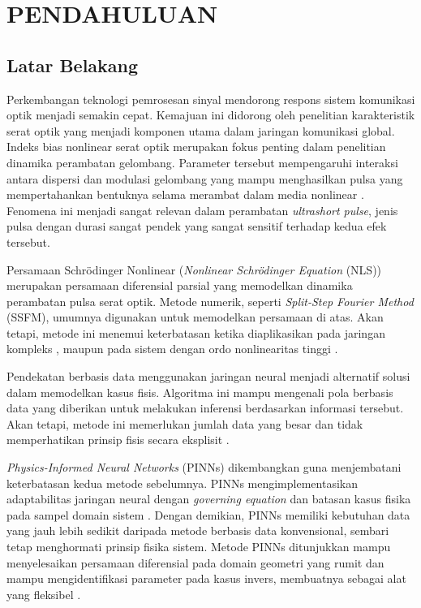 \chapter{PENDAHULUAN}

\section{Latar Belakang}
Perkembangan teknologi pemrosesan sinyal mendorong respons sistem komunikasi optik menjadi semakin cepat. Kemajuan ini didorong oleh penelitian karakteristik serat optik yang menjadi komponen utama dalam jaringan komunikasi global. Indeks bias nonlinear serat optik merupakan fokus penting dalam penelitian dinamika perambatan gelombang. Parameter tersebut mempengaruhi interaksi antara dispersi dan modulasi gelombang yang mampu menghasilkan pulsa yang mempertahankan bentuknya selama merambat dalam media nonlinear . Fenomena ini menjadi sangat relevan dalam perambatan \emph{ultrashort pulse}, jenis pulsa dengan durasi sangat pendek yang sangat sensitif terhadap kedua efek tersebut. 

Persamaan Schr\"{o}dinger Nonlinear (\textit{Nonlinear Schr\"{o}dinger Equation }(NLS)) merupakan persamaan diferensial parsial yang memodelkan dinamika perambatan pulsa serat optik. Metode numerik, seperti \textit{Split-Step Fourier Method} (SSFM), umumnya digunakan untuk memodelkan persamaan di atas. Akan tetapi, metode ini menemui keterbatasan ketika diaplikasikan pada jaringan kompleks , maupun pada sistem dengan ordo nonlinearitas tinggi . 

Pendekatan berbasis data menggunakan jaringan neural menjadi alternatif solusi dalam memodelkan kasus fisis. Algoritma ini mampu mengenali pola berbasis data yang diberikan untuk melakukan inferensi berdasarkan informasi tersebut. Akan tetapi, metode ini memerlukan jumlah data yang besar dan tidak memperhatikan prinsip fisis secara eksplisit . 

\textit{Physics-Informed Neural Networks} (PINNs) dikembangkan guna menjembatani keterbatasan kedua metode sebelumnya. PINNs mengimplementasikan adaptabilitas jaringan neural dengan \emph{governing equation} dan batasan kasus fisika pada sampel domain sistem . Dengan demikian, PINNs memiliki kebutuhan data yang jauh lebih sedikit daripada metode berbasis data konvensional, sembari tetap menghormati prinsip fisika sistem. Metode PINNs ditunjukkan mampu menyelesaikan persamaan diferensial pada domain geometri yang rumit dan mampu mengidentifikasi parameter pada kasus invers, membuatnya sebagai alat yang fleksibel .

